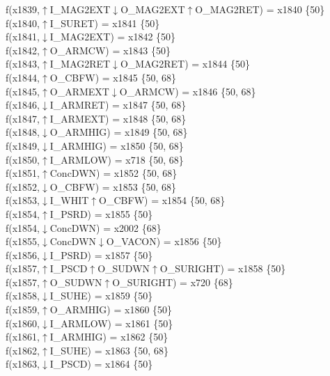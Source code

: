 f(x1839,$\uparrow$I\_MAG2EXT$\downarrow$O\_MAG2EXT$\uparrow$O\_MAG2RET) = x1840 \{50\} \\  
f(x1840,$\uparrow$I\_SURET) = x1841 \{50\} \\  
f(x1841,$\downarrow$I\_MAG2EXT) = x1842 \{50\} \\  
f(x1842,$\uparrow$O\_ARMCW) = x1843 \{50\} \\  
f(x1843,$\uparrow$I\_MAG2RET$\downarrow$O\_MAG2RET) = x1844 \{50\} \\  
f(x1844,$\uparrow$O\_CBFW) = x1845 \{50, 68\} \\  
f(x1845,$\uparrow$O\_ARMEXT$\downarrow$O\_ARMCW) = x1846 \{50, 68\} \\  
f(x1846,$\downarrow$I\_ARMRET) = x1847 \{50, 68\} \\  
f(x1847,$\uparrow$I\_ARMEXT) = x1848 \{50, 68\} \\  
f(x1848,$\downarrow$O\_ARMHIG) = x1849 \{50, 68\} \\  
f(x1849,$\downarrow$I\_ARMHIG) = x1850 \{50, 68\} \\  
f(x1850,$\uparrow$I\_ARMLOW) = x718 \{50, 68\} \\  
f(x1851,$\uparrow$ConcDWN) = x1852 \{50, 68\} \\  
f(x1852,$\downarrow$O\_CBFW) = x1853 \{50, 68\} \\  
f(x1853,$\downarrow$I\_WHIT$\uparrow$O\_CBFW) = x1854 \{50, 68\} \\  
f(x1854,$\uparrow$I\_PSRD) = x1855 \{50\} \\  
f(x1854,$\downarrow$ConcDWN) = x2002 \{68\} \\  
f(x1855,$\downarrow$ConcDWN$\downarrow$O\_VACON) = x1856 \{50\} \\  
f(x1856,$\downarrow$I\_PSRD) = x1857 \{50\} \\  
f(x1857,$\uparrow$I\_PSCD$\uparrow$O\_SUDWN$\uparrow$O\_SURIGHT) = x1858 \{50\} \\  
f(x1857,$\uparrow$O\_SUDWN$\uparrow$O\_SURIGHT) = x720 \{68\} \\  
f(x1858,$\downarrow$I\_SUHE) = x1859 \{50\} \\  
f(x1859,$\uparrow$O\_ARMHIG) = x1860 \{50\} \\  
f(x1860,$\downarrow$I\_ARMLOW) = x1861 \{50\} \\  
f(x1861,$\uparrow$I\_ARMHIG) = x1862 \{50\} \\  
f(x1862,$\uparrow$I\_SUHE) = x1863 \{50, 68\} \\  
f(x1863,$\downarrow$I\_PSCD) = x1864 \{50\} \\  

